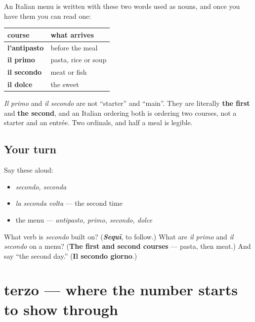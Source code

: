 \begin{culture}
An Italian menu is written with these two words used as nouns, and once you have them you can read one:

\noindent
\begin{tabularx}{\linewidth}{@{}>{\raggedright\arraybackslash}X>{\raggedright\arraybackslash}X@{}}
\toprule
\textbf{course} & \textbf{what arrives} \\
\midrule
\textbf{l'antipasto} & before the meal \\
\textbf{il primo} & pasta, rice or soup \\
\textbf{il secondo} & meat or fish \\
\textbf{il dolce} & the sweet \\
\bottomrule
\end{tabularx}

\emph{Il primo} and \emph{il secondo} are not \textquotedblleft{}starter\textquotedblright{} and \textquotedblleft{}main\textquotedblright{}. They are literally \textbf{the first} and \textbf{the second}, and an Italian ordering both is ordering two courses, not a starter and an entrée. Two ordinals, and half a meal is legible.
\end{culture}

\subsection*{Your turn}
Say these aloud:

\begin{itemize}
\raggedright
  \item \emph{secondo, seconda}
  \item \emph{la seconda volta} — the second time
  \item the menu — \emph{antipasto, primo, secondo, dolce}
\end{itemize}

\begin{tcolorbox}[breakable,colback=teal!4,colframe=teal!35!black,title={Before you move on}]
What verb is \emph{secondo} built on? (\emph{\textbf{Sequī}}, to follow.) What are \emph{il primo} and \emph{il secondo} on a menu? (\textbf{The first and second courses} — pasta, then meat.) And say \textquotedblleft{}the second day.\textquotedblright{} (\textbf{Il secondo giorno}.)
\end{tcolorbox}
\section[terzo / terza]{terzo — where the number starts to show through}

